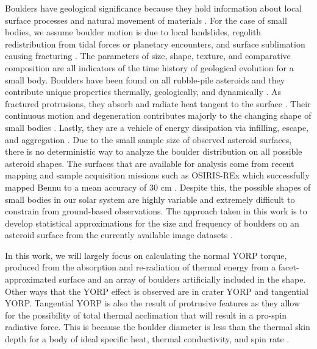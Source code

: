 Boulders have geological significance because they hold information about local surface processes and natural movement of materials \cite{Murdoch2015}. For the case of small bodies, we assume boulder motion is due to local landslides, regolith redistribution from tidal forces or planetary encounters, and surface sublimation causing fracturing \cite{Delbo2022} \cite{Barnouin2022}. The parameters of size, shape, texture, and comparative composition are all indicators of the time history of geological evolution for a small body. Boulders have been found on all rubble-pile asteroids and they contribute unique properties thermally, geologically, and dynamically \cite{Kuppers2012}. As fractured protrusions, they absorb and radiate heat tangent to the surface \cite{Golubov2022}. Their continuous motion and degeneration contributes majorly to the changing shape of small bodies \cite{Molaro2020} \cite{Scheeres2015}\cite{Scheeres2018}\cite{Zhang2022}. Lastly, they are a vehicle of energy dissipation via infilling, escape, and aggregation \cite{Holsapple2010}.
Due to the small sample size of observed asteroid surfaces, there is no deterministic way to analyze the boulder distribution on all possible asteroid shapes. The surfaces that are available for analysis come from recent mapping and sample acquisition missions such as OSIRIS-REx which successfully mapped Bennu to a mean accuracy of 30 cm \cite{Bennett2021}. Despite this, the possible shapes of small bodies in our solar system are highly variable and extremely difficult to constrain from ground-based observations. The approach taken in this work is to develop statistical approximations for the size and frequency of boulders on an asteroid surface from the currently available image datasets \cite{DellaGiustina2019}\cite{Fujiwara2006}\cite{Watanabe2019}.

In this work, we will largely focus on calculating the normal YORP torque, produced from the absorption and re-radiation of thermal energy from a facet-approximated surface and an array of boulders artificially included in the shape. Other ways that the YORP effect is observed are in crater YORP and tangential YORP. Tangential YORP is also the result of protrusive features as they allow for the possibility of total thermal acclimation that will result in a pro-spin radiative force. This is because the boulder diameter is less than the thermal skin depth for a body of ideal specific heat, thermal conductivity, and spin rate \cite{Golubov2017}.  





